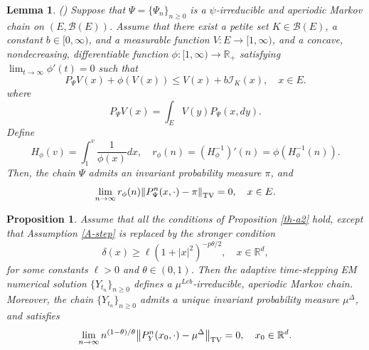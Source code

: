 \documentclass[preprint,12pt,compress]{elsarticle}
\newtheorem{lemma}[theorem]{Lemma}%
\newtheorem{proposition}[theorem]{Proposition}
\begin{document}
\begin{lemma} \label{aap2004} (\cite[Proposition 2.5]{douc2004practical})
	Suppose that $\Psi  = {\{ {\Psi _n}\} _{n \ge 0}}$ is a $\psi$-irreducible and aperiodic Markov chain on $(E, \mathcal{B}(E))$.
	Assume that there exist a petite set $K \in \mathcal{B}(E)$, a constant $b \in [0, \infty)$, and a measurable function $V:E \to [1, \infty)$, and a concave, nondecreasing, differentiable function $\phi: [1,\infty) \to \mathbb{R}_+ $ satisfying ${\lim _{t \to \infty }}\phi '(t) = 0$ such that
	\begin{equation*}  
		{P_\Psi }V(x)  +\phi(V(x)) \le V(x) + b{\mathcal{I}_K}(x), \quad x \in E.
	\end{equation*}
	where 
	\begin{equation*}
		{P_\Psi }V(x) = \int_E {V(y){P_\Psi }(x,dy)}. 
	\end{equation*}
	Define
	\begin{equation*}
		{H_\phi }(v) = \int_1^v {\frac{1}{{\phi (x)}}dx}, \quad {r_\phi }(n) = (H_\phi ^{ - 1})'(n) = \phi (H_\phi ^{ - 1}(n)).
	\end{equation*}
	Then, the chain $\Psi$ admits an invariant probability measure $\pi$, and
	\begin{equation*}
		\mathop {\lim }\limits_{n \to \infty } {r_\phi }(n){\left\| {P_\Psi ^n({x}, \cdot ) - \pi } \right\|_{{\rm{TV}}}} = 0, \quad x \in E.
	\end{equation*}
\end{lemma}

\begin{proposition}  \label{th-a6}
Assume that all the conditions of Proposition \ref{th-a2} hold, except that Assumption \ref{A-step} is replaced by the stronger condition
\begin{equation}  \label{delta1}
	\delta (x) \ge \ell {\left( {1 + {{\left| x \right|}^2}} \right)^{ - p\theta /2}}, \quad x\in \mathbb{R}^d,
\end{equation}
for some constants $\ell > 0$ and $\theta \in (0,1)$. 
Then the adaptive time-stepping EM numerical solution ${\{ {Y_{{t_n}}}\}  _{n \ge 0}}$ defines a $\mu^{Leb}$-irreducible, aperiodic Markov chain. Moreover, the chain ${\{ {Y_{{t_n}}}\} _{n \ge 0}}$ admits a unique invariant probability measure $\mu^\Delta$, and satisfies
\begin{equation*}
	\mathop {\lim }\limits_{n \to \infty } {n^{(1 - \theta )/\theta}}{\left\| {P_Y^n({x_0}, \cdot ) - {\mu ^\Delta }} \right\|_{{\rm{TV}}}} = 0, \quad x_0 \in \mathbb{R}^d.
\end{equation*}
\end{proposition}
\end{document}
